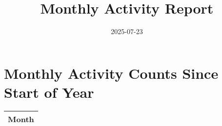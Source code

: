 \documentclass{article}%
\title{Monthly Activity Report}%
\date{2025-07-23}%
\begin{document}
%
\normalsize%
\maketitle%
\section{Monthly Activity Counts Since Start of Year}%
\label{sec:MonthlyActivityCountsSinceStartofYear}%


\begin{table}%
\begin{tabular}{c}%
Month\\%
\hline%
\end{tabular}%
\end{table}

%
\end{document}
